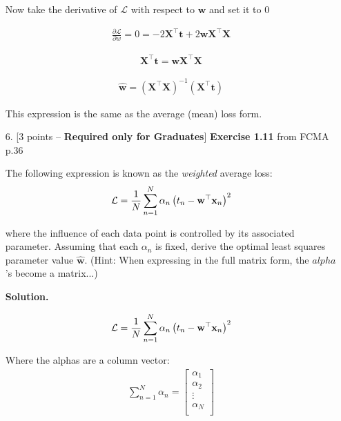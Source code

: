 \documentclass[10pt]{article}
\begin{document}
\begin{itemize}
Now take the derivative of $\mathcal{L}$ with respect to $\mathbf{w}$ and set it to 0

\begin{eqnarray*}
\frac{\partial \mathcal{L} } {\partial w} = 0 = -2\mathbf{X}^\top \mathbf{t} + 2 \mathbf{w} \mathbf{X}^\top \mathbf{X}
\end{eqnarray*}

\begin{eqnarray*}
 \mathbf{X}^\top \mathbf{t} =  \mathbf{w} \mathbf{X}^\top \mathbf{X}
\end{eqnarray*}

\begin{eqnarray*}
 \mathbf{\hat{w}} = (\mathbf{X}^\top \mathbf{X})^{-1} (\mathbf{X}^\top \mathbf{t})
\end{eqnarray*}

This expression is the same as the average (mean) loss form.

\newpage

\item[6.] [3 points -- {\bf Required only for Graduates}]
{\bf Exercise 1.11} from FCMA p.36

The following expression is known as the {\em weighted} average loss:
\begin{eqnarray*}
\mathcal{L} = {1 \over N} \sum_{n=1}^N \alpha_n \left( t_n - \mathbf{w}^\top \mathbf{x}_n \right)^2
\end{eqnarray*}

where the influence of each data point is controlled by its associated parameter.  Assuming that each $\alpha_n$ is fixed, derive the optimal least squares parameter value $\mathbf{\hat{w}}$.  (Hint: When expressing in the full matrix form, the $alpha$'s become a matrix...)

{\bf Solution.} 

\begin{eqnarray*}
\mathcal{L} = {1 \over N} \sum_{n=1}^N \alpha_n \left( t_n - \mathbf{w}^\top \mathbf{x}_n \right)^2
\end{eqnarray*}

Where the alphas are a column vector:
\begin{eqnarray*}
\sum_{n=1}^N \alpha_n = 
    \begin{bmatrix}
    {\alpha_1} \\[0.3em]
    {\alpha_2} \\[0.3em]
    \vdots \\[0.3em]
    {\alpha_N} \\[0.3em]
    \end{bmatrix}
\end{eqnarray*}


\end{itemize}
\end{document}
